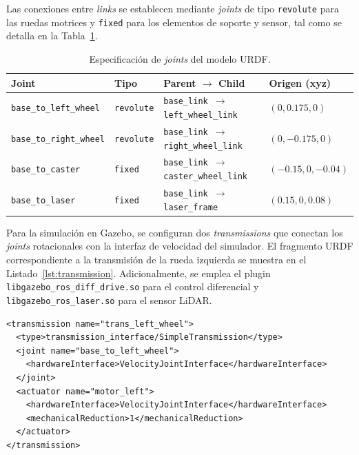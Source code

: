 \documentclass[12pt,letterpaper]{article}
\begin{document}
Las conexiones entre \textit{links} se establecen mediante \textit{joints} de tipo \texttt{revolute} para las ruedas motrices y \texttt{fixed} para los elementos de soporte y sensor, tal como se detalla en la Tabla~\ref{tab:joints}.

\begin{table}[H]
    \centering
    \caption{Especificación de \textit{joints} del modelo URDF.}
    \label{tab:joints}
    \begin{tabular}{llll}
        \hline
        \textbf{Joint} & \textbf{Tipo} & \textbf{Parent $\rightarrow$ Child} & \textbf{Origen (xyz)} \\
        \hline
        \texttt{base\_to\_left\_wheel} & \texttt{revolute} & \texttt{base\_link $\rightarrow$ left\_wheel\_link} & $(0, 0.175, 0)$ \\
        \texttt{base\_to\_right\_wheel} & \texttt{revolute} & \texttt{base\_link $\rightarrow$ right\_wheel\_link} & $(0, -0.175, 0)$ \\
        \texttt{base\_to\_caster} & \texttt{fixed} & \texttt{base\_link $\rightarrow$ caster\_wheel\_link} & $(-0.15, 0, -0.04)$ \\
        \texttt{base\_to\_laser} & \texttt{fixed} & \texttt{base\_link $\rightarrow$ laser\_frame} & $(0.15, 0, 0.08)$ \\
        \hline
    \end{tabular}
\end{table}

Para la simulación en Gazebo, se configuran dos \textit{transmissions} que conectan los \textit{joints} rotacionales con la interfaz de velocidad del simulador. El fragmento URDF correspondiente a la transmisión de la rueda izquierda se muestra en el Listado~\ref{lst:transmission}. Adicionalmente, se emplea el plugin \texttt{libgazebo\_ros\_diff\_drive.so} para el control diferencial y \texttt{libgazebo\_ros\_laser.so} para el sensor LiDAR.

\begin{lstlisting}[caption={Transmisión URDF para rueda izquierda.}, label={lst:transmission}, style=xmlstyle]
<transmission name="trans_left_wheel">
  <type>transmission_interface/SimpleTransmission</type>
  <joint name="base_to_left_wheel">
    <hardwareInterface>VelocityJointInterface</hardwareInterface>
  </joint>
  <actuator name="motor_left">
    <hardwareInterface>VelocityJointInterface</hardwareInterface>
    <mechanicalReduction>1</mechanicalReduction>
  </actuator>
</transmission>
\end{lstlisting}
\end{document}

